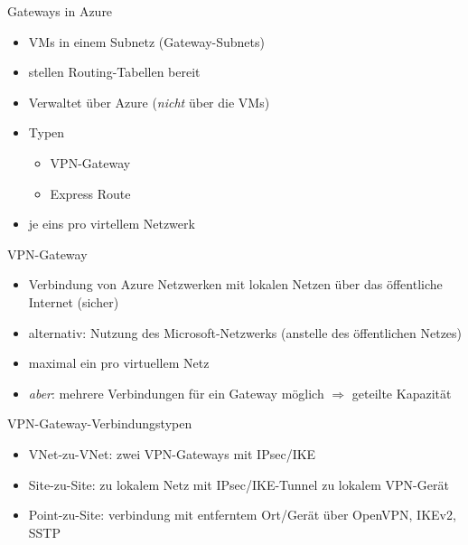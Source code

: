 
\begin{flashcard}[]{Gateways in Azure}
  \begin{itemize}
    \item VMs in einem Subnetz (Gateway-Subnets)
    \item stellen Routing-Tabellen bereit
    \item Verwaltet über Azure (\emph{nicht} über die VMs)
    \item Typen
      \begin{itemize}
        \item VPN-Gateway
        \item Express Route
      \end{itemize}
    \item je eins pro virtellem Netzwerk
  \end{itemize}
\end{flashcard}

\begin{flashcard}[]{VPN-Gateway}
  \begin{itemize}
    \item Verbindung von Azure Netzwerken mit lokalen Netzen über das öffentliche Internet (sicher)
    \item alternativ: Nutzung des Microsoft-Netzwerks (anstelle des öffentlichen Netzes)
    \item maximal ein pro virtuellem Netz
    \item \emph{aber}: mehrere Verbindungen für ein Gateway möglich\newline
      $\Rightarrow$ geteilte Kapazität
  \end{itemize}
\end{flashcard}

\begin{flashcard}[]{VPN-Gateway-Verbindungstypen}
  \begin{itemize}
    \item VNet-zu-VNet: zwei VPN-Gateways mit IPsec/IKE
    \item Site-zu-Site: zu lokalem Netz mit IPsec/IKE-Tunnel zu lokalem VPN-Gerät
    \item Point-zu-Site: verbindung mit entferntem Ort/Gerät über OpenVPN, IKEv2, SSTP
  \end{itemize}
\end{flashcard}

